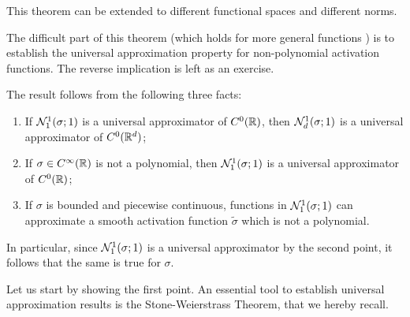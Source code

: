 
\begin{remark}
    This theorem can be extended to different functional spaces and different norms.
\end{remark}

The difficult part of this theorem (which holds for more general functions \cite{leshnoMultilayer1993}) is to establish the universal approximation property for non-polynomial activation functions. The reverse implication is left as an exercise.

The result follows from the following three facts:
\begin{enumerate}
    \item If $\mathcal{N}_1^1(\sigma;1)$ is a universal approximator of $C^0(\mathbb{R})$, then $\mathcal{N}_d^1(\sigma;1)$ is a universal approximator of $C^0(\mathbb{R}^d)$;
    \item If $\sigma\in C^\infty(\mathbb{R})$ is not a polynomial, then $\mathcal{N}_1^1(\sigma;1)$ is a universal approximator of $C^0(\mathbb{R})$;
    \item If $\sigma$ is bounded and piecewise continuous, functions in $\mathcal{N}_1^1(\sigma;1)$ can approximate a smooth activation function $\tilde \sigma$ which is not a polynomial.
\end{enumerate}
In particular, since $\mathcal{N}_1^1(\sigma;1)$ is a universal approximator by the second point, it follows that the same is true for $\sigma$.


Let us start by showing the first point.
An essential tool to establish universal approximation results is the Stone-Weierstrass Theorem, that we hereby recall.

